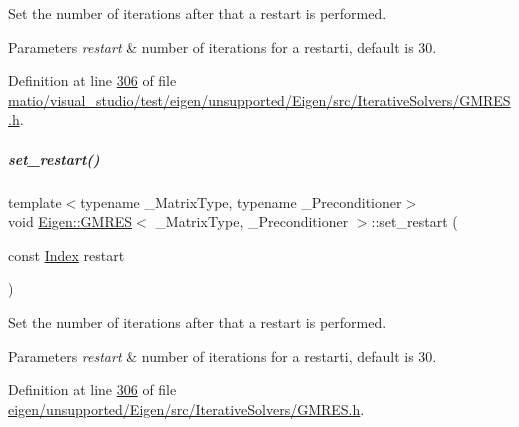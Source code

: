 Set the number of iterations after that a restart is performed. 
\begin{DoxyParams}{Parameters}
{\em restart} & number of iterations for a restarti, default is 30. \\
\hline
\end{DoxyParams}


Definition at line \hyperlink{matio_2visual__studio_2test_2eigen_2unsupported_2_eigen_2src_2_iterative_solvers_2_g_m_r_e_s_8h_source_l00306}{306} of file \hyperlink{matio_2visual__studio_2test_2eigen_2unsupported_2_eigen_2src_2_iterative_solvers_2_g_m_r_e_s_8h_source}{matio/visual\+\_\+studio/test/eigen/unsupported/\+Eigen/src/\+Iterative\+Solvers/\+G\+M\+R\+E\+S.\+h}.

\mbox{\label{group___iterative_linear_solvers___module_ac50d6bbca4a8a275861770feb211900d}} 
\subparagraph{\texorpdfstring{set\+\_\+restart()}{set\_restart()}\hspace{0.1cm}{\footnotesize\ttfamily [2/2]}}
{\footnotesize\ttfamily template$<$typename \+\_\+\+Matrix\+Type, typename \+\_\+\+Preconditioner$>$ \\
void \hyperlink{group___iterative_linear_solvers___module_class_eigen_1_1_g_m_r_e_s}{Eigen\+::\+G\+M\+R\+ES}$<$ \+\_\+\+Matrix\+Type, \+\_\+\+Preconditioner $>$\+::set\+\_\+restart (\begin{DoxyParamCaption}\item[{const \hyperlink{namespace_eigen_a62e77e0933482dafde8fe197d9a2cfde}{Index}}]{restart }\end{DoxyParamCaption})\hspace{0.3cm}{\ttfamily [inline]}}

Set the number of iterations after that a restart is performed. 
\begin{DoxyParams}{Parameters}
{\em restart} & number of iterations for a restarti, default is 30. \\
\hline
\end{DoxyParams}


Definition at line \hyperlink{eigen_2unsupported_2_eigen_2src_2_iterative_solvers_2_g_m_r_e_s_8h_source_l00306}{306} of file \hyperlink{eigen_2unsupported_2_eigen_2src_2_iterative_solvers_2_g_m_r_e_s_8h_source}{eigen/unsupported/\+Eigen/src/\+Iterative\+Solvers/\+G\+M\+R\+E\+S.\+h}.

